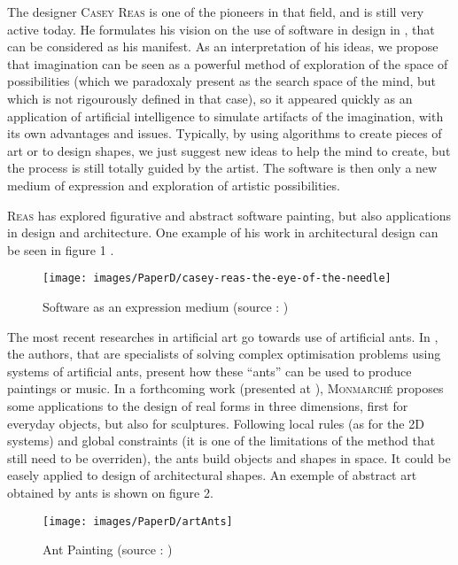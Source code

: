 \documentclass[english]{article}
\newcommand{\noun}[1]{\textsc{#1}}
\begin{document}
The designer \noun{Casey Reas} is one of the pioneers in that field,
and is still very active today. He formulates his vision on the use
of software in design in \cite{reas2010form+}, that can be considered
as his manifest. As an interpretation of his ideas, we propose that
imagination can be seen as a powerful method of exploration of the
space of possibilities (which we paradoxaly present as the search
space of the mind, but which is not rigourously defined in that case),
so it appeared quickly as an application of artificial intelligence
to simulate artifacts of the imagination, with its own advantages
and issues. Typically, by using algorithms to create pieces of art
or to design shapes, we just suggest new ideas to help the mind to
create, but the process is still totally guided by the artist. The
software is then only a new medium of expression and exploration of
artistic possibilities.

\noun{Reas} has explored figurative and abstract software painting,
but also applications in design and architecture. One example of his
work in architectural design can be seen in figure 1 .

\begin{figure}


\texttt{[image: images/PaperD/casey-reas-the-eye-of-the-needle]}\caption{Software as an expression medium (source : \cite{reas2010form+})}


\end{figure}


\bigskip{}


The most recent researches in artificial art go towards use of artificial
ants. In \cite{monmarche2008artificial}, the authors, that are specialists
of solving complex optimisation problems using systems of artificial
ants, present how these ``ants'' can be used to produce paintings
or music. In a forthcoming work (presented at \cite{lectureAnts}),
\noun{Monmarché} proposes some applications to the design of real
forms in three dimensions, first for everyday objects, but also for
sculptures. Following local rules (as for the 2D systems) and global
constraints (it is one of the limitations of the method that still
need to be overriden), the ants build objects and shapes in space.
It could be easely applied to design of architectural shapes. An exemple
of abstract art obtained by ants is shown on figure 2.

\begin{figure}


\texttt{[image: images/PaperD/artAnts]}\caption{Ant Painting (source : \cite{monmarche2008artificial})}


\end{figure}
\end{document}
